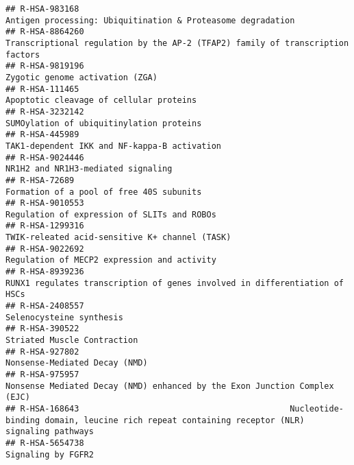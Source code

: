 \documentclass[
]{article}
\begin{document}
\begin{verbatim}
## R-HSA-983168                                                                           Antigen processing: Ubiquitination & Proteasome degradation
## R-HSA-8864260                                                       Transcriptional regulation by the AP-2 (TFAP2) family of transcription factors
## R-HSA-9819196                                                                                                      Zygotic genome activation (ZGA)
## R-HSA-111465                                                                                               Apoptotic cleavage of cellular proteins
## R-HSA-3232142                                                                                             SUMOylation of ubiquitinylation proteins
## R-HSA-445989                                                                                        TAK1-dependent IKK and NF-kappa-B activation  
## R-HSA-9024446                                                                                                   NR1H2 and NR1H3-mediated signaling
## R-HSA-72689                                                                                               Formation of a pool of free 40S subunits
## R-HSA-9010553                                                                                          Regulation of expression of SLITs and ROBOs
## R-HSA-1299316                                                                                       TWIK-releated acid-sensitive K+ channel (TASK)
## R-HSA-9022692                                                                                          Regulation of MECP2 expression and activity
## R-HSA-8939236                                                           RUNX1 regulates transcription of genes involved in differentiation of HSCs
## R-HSA-2408557                                                                                                             Selenocysteine synthesis
## R-HSA-390522                                                                                                           Striated Muscle Contraction
## R-HSA-927802                                                                                                         Nonsense-Mediated Decay (NMD)
## R-HSA-975957                                                             Nonsense Mediated Decay (NMD) enhanced by the Exon Junction Complex (EJC)
## R-HSA-168643                                           Nucleotide-binding domain, leucine rich repeat containing receptor (NLR) signaling pathways
## R-HSA-5654738                                                                                                                   Signaling by FGFR2

\end{verbatim}
\end{document}
